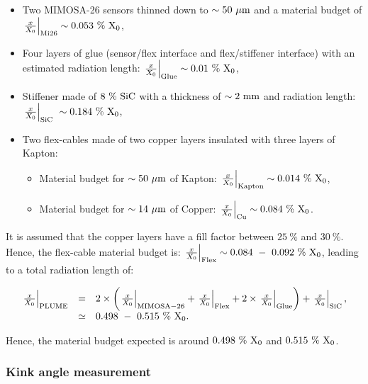      \begin{itemize}
       \item Two \gls{MIMOSA}-26 sensors thinned down to $\sim 50~\rm{\mu m}$ and a material budget of $\left. \frac{x}{X_0} \right|_{\rm{Mi26}} \sim 0.053~\%~\rm{X_{0}}$,
       \item Four layers of glue (sensor/flex interface and flex/stiffener interface) with an estimated radiation length: $\left. \frac{x}{X_0} \right|_{\rm{Glue}} \sim 0.01~\%~\rm{X_0}$,
       \item Stiffener made of $8~\%~\rm{SiC}$ with a thickness of $\sim 2~\rm{mm}$ and radiation length: $\left. \frac{x}{X_0} \right|_{\rm{SiC}} ~\sim 0.184~\%~\rm{X_{0}}$,
       \item Two flex-cables made of two copper layers insulated with three layers of Kapton:
       \begin{itemize}
         \item Material budget for $\sim 50~\rm{\mu m}$ of Kapton: $\left. \frac{x}{X_0} \right|_{\rm{Kapton}} \sim 0.014~\%~\rm{X_{0}}$,
         \item Material budget for $\sim 14~\rm{\mu m}$ of Copper: $\left. \frac{x}{X_0} \right|_{\rm{Cu}} \sim 0.084~\%~\rm{X_{0}}$.
       \end{itemize}
     \end{itemize}

     It is assumed that the copper layers have a fill factor between $25~\%$ and $30~\%$.
     Hence, the flex-cable material budget is: $\left. \frac{x}{X_0} \right|_{\rm{Flex}} \sim 0.084~-~0.092~\%~\rm{X_0}$, leading to a total radiation length of:

     \begin{equation}
       \begin{array}{lcl}
         \left. \frac{x}{X_0} \right|_{\rm{PLUME}} & = & 2 \times \left( \left. \frac{x}{X_0} \right|_{\rm{MIMOSA-26}} + \left. \frac{x}{X_0} \right|_{\rm{Flex}} + 2 \times \left. \frac{x}{X_0} \right|_{\rm{Glue}}\right) + \left. \frac{x}{X_0} \right|_{\rm{SiC}}, \\
         & \simeq & 0.498~-~0.515~\%~\rm{X_0}.
       \end{array}
     \end{equation}

     Hence, the material budget expected is around $0.498~\%~\rm{X_0}$ and $0.515~\%~\rm{X_0}$.

     \subsubsection{Kink angle measurement}

